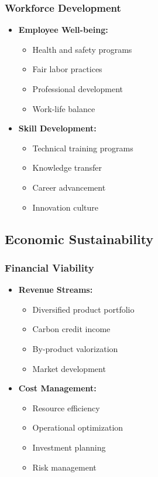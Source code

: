 \subsubsection{Workforce Development}
\begin{itemize}
    \item \textbf{Employee Well-being:}
    \begin{itemize}
        \item Health and safety programs
        \item Fair labor practices
        \item Professional development
        \item Work-life balance
    \end{itemize}
    
    \item \textbf{Skill Development:}
    \begin{itemize}
        \item Technical training programs
        \item Knowledge transfer
        \item Career advancement
        \item Innovation culture
    \end{itemize}
\end{itemize}

\subsection{Economic Sustainability}

\subsubsection{Financial Viability}
\begin{itemize}
    \item \textbf{Revenue Streams:}
    \begin{itemize}
        \item Diversified product portfolio
        \item Carbon credit income
        \item By-product valorization
        \item Market development
    \end{itemize}
    
    \item \textbf{Cost Management:}
    \begin{itemize}
        \item Resource efficiency
        \item Operational optimization
        \item Investment planning
        \item Risk management
    \end{itemize}
\end{itemize}

